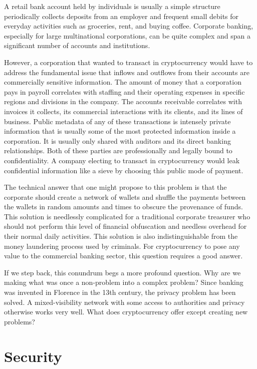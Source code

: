A retail bank account held by individuals is usually a simple structure
periodically collects deposits from an employer and frequent small debits for
everyday activities such as groceries, rent, and buying coffee.  Corporate
banking, especially for large multinational corporations, can be quite complex
and span a significant number of accounts and institutions.

However, a corporation that wanted to transact in cryptocurrency would have to
address the fundamental issue that inflows and outflows from their accounts are
commercially sensitive information. The amount of money that a corporation pays
in payroll correlates with staffing and their operating expenses in specific
regions and divisions in the company. The accounts receivable correlates with
invoices it collects, its commercial interactions with its clients, and its
lines of business. Public metadata of any of these transactions is intensely
private information that is usually some of the most protected information
inside a corporation. It is usually only shared with auditors and its direct
banking relationships. Both of these parties are professionally and legally
bound to confidentiality. A company electing to transact in cryptocurrency would
leak confidential information like a sieve by choosing this public mode of
payment.

The technical answer that one might propose to this problem is that the
corporate should create a network of wallets and shuffle the payments between
the wallets in random amounts and times to obscure the provenance of funds. This
solution is needlessly complicated for a traditional corporate treasurer who
should not perform this level of financial obfuscation and needless overhead for
their normal daily activities. This solution is also indistinguishable from the
money laundering process used by criminals. For cryptocurrency to pose any value
to the commercial banking sector, this question requires a good answer.


If we step back, this conundrum begs a more profound question. Why are we making
what was once a non-problem into a complex problem? Since banking was invented
in Florence in the 13th century, the privacy problem has been solved. A
mixed-visibility network with some access to authorities and privacy otherwise
works very well. What does cryptocurrency offer except creating new problems?

\section{Security}

